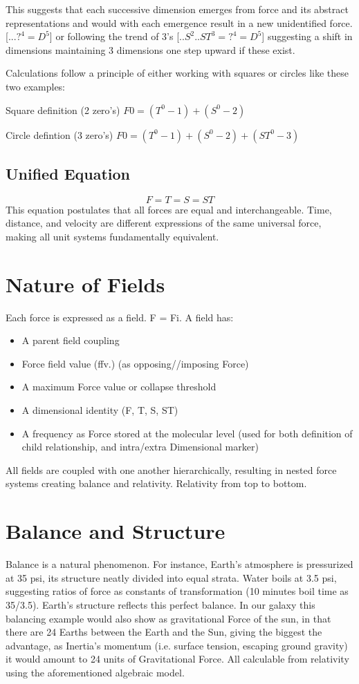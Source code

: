\documentclass[12pt]{thesis}
\begin{document}
\noindent This suggests that each successive dimension emerges from force and its abstract representations and would with each emergence result in a new unidentified force. [$...?^4 = D^5$] or following the trend of 3's [$..S^2..ST^3 = ?^4 = D^5$] suggesting a shift in dimensions maintaining 3 dimensions one step upward if these exist.

Calculations follow a principle of either working with squares or circles like these two examples:

Square definition (2 zero's)
$F0 = (T^0-1)+(S^0-2)$

Circle defintion (3 zero's)
$F0 = (T^0-1)+(S^0-2)+(ST^0-3)$

\subsection{Unified Equation}
\[
F = T = S = ST
\]
This equation postulates that all forces are equal and interchangeable. Time, distance, and velocity are different expressions of the same universal force, making all unit systems fundamentally equivalent.

\section{Nature of Fields}
Each force is expressed as a field. F = Fi. A field has:
\begin{itemize}
    \item A parent field coupling
    \item Force field value (ffv.) (as opposing//imposing Force)
    \item A maximum Force value or collapse threshold
    \item A dimensional identity (F, T, S, ST)
    \item A frequency as Force stored at the molecular level (used for both definition of child relationship, and intra/extra Dimensional marker)
\end{itemize}

All fields are coupled with one another hierarchically, resulting in nested force systems creating balance and relativity. Relativity from top to bottom.

\section{Balance and Structure}
Balance is a natural phenomenon. For instance, Earth’s atmosphere is pressurized at 35 psi, its structure neatly divided into equal strata. Water boils at 3.5 psi, suggesting ratios of force as constants of transformation (10 minutes boil time as 35/3.5). Earth’s structure reflects this perfect balance. In our galaxy this balancing example would also show as gravitational Force of the sun, in that there are 24 Earths between the Earth and the Sun, giving the biggest the advantage, as Inertia's momentum (i.e. surface tension, escaping ground gravity) it would amount to 24 units of Gravitational Force. All calculable from relativity using the aforementioned algebraic model.
\end{document}
